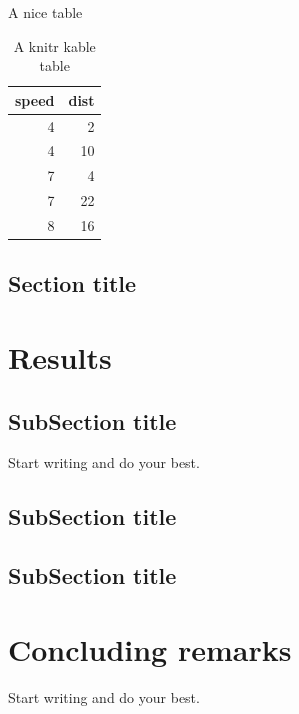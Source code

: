 \documentclass[a4paper, nobind]{templates/ociamthesis}
\begin{document}
A nice table

\begin{table}

\caption{\label{tab:unnamed-chunk-1}A knitr kable table}
\centering
\begin{tabular}[t]{r|r}
\hline
speed & dist\\
\hline
4 & 2\\
\hline
4 & 10\\
\hline
7 & 4\\
\hline
7 & 22\\
\hline
8 & 16\\
\hline
\end{tabular}
\end{table}

\hypertarget{section-title-2}{%
\section{Section title}\label{section-title-2}}

\hypertarget{results}{%
\chapter{Results}\label{results}}

\hypertarget{subsection-title-5}{%
\section{SubSection title}\label{subsection-title-5}}

Start writing and do your best.

\hypertarget{subsection-title-6}{%
\section{SubSection title}\label{subsection-title-6}}

\hypertarget{subsection-title-7}{%
\section{SubSection title}\label{subsection-title-7}}

\hypertarget{concluding-remarks}{%
\chapter{Concluding remarks}\label{concluding-remarks}}

Start writing and do your best.
\end{document}
